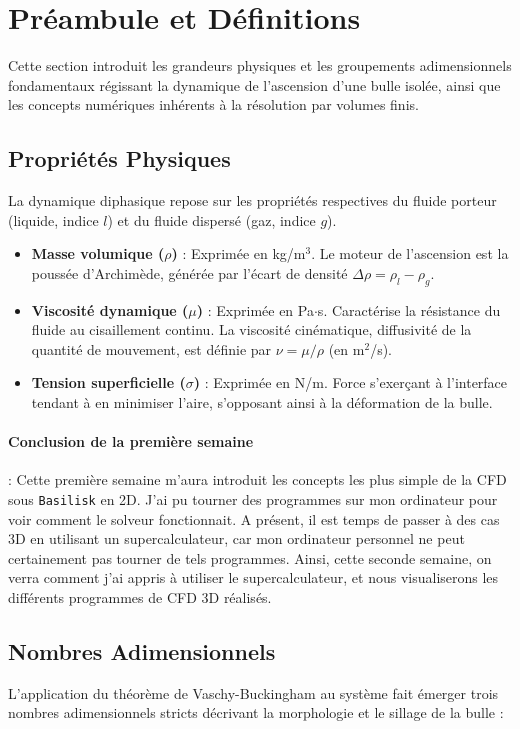 \section{Préambule et Définitions}

Cette section introduit les grandeurs physiques et les groupements adimensionnels fondamentaux régissant la dynamique de l'ascension d'une bulle isolée, ainsi que les concepts numériques inhérents à la résolution par volumes finis.

\subsection{Propriétés Physiques}
La dynamique diphasique repose sur les propriétés respectives du fluide porteur (liquide, indice $l$) et du fluide dispersé (gaz, indice $g$).
\begin{itemize}
    \item \textbf{Masse volumique ($\rho$)} : Exprimée en kg/m$^3$. Le moteur de l'ascension est la poussée d'Archimède, générée par l'écart de densité $\Delta\rho = \rho_l - \rho_g$.
    \item \textbf{Viscosité dynamique ($\mu$)} : Exprimée en Pa$\cdot$s. Caractérise la résistance du fluide au cisaillement continu. La viscosité cinématique, diffusivité de la quantité de mouvement, est définie par $\nu = \mu / \rho$ (en m$^2$/s).
    \item \textbf{Tension superficielle ($\sigma$)} : Exprimée en N/m. Force s'exerçant à l'interface tendant à en minimiser l'aire, s'opposant ainsi à la déformation de la bulle.
\end{itemize}
\paragraph{Conclusion de la première semaine}: Cette première semaine m'aura introduit les concepts les plus simple de la CFD sous \texttt{Basilisk} en 2D. J'ai pu tourner des programmes sur mon ordinateur pour voir comment le solveur fonctionnait. A présent, il est temps de passer à des cas 3D en utilisant un supercalculateur, car mon ordinateur personnel ne peut certainement pas tourner de tels programmes. Ainsi, cette seconde semaine, on verra comment j'ai appris à utiliser le supercalculateur, et nous visualiserons les différents programmes de CFD 3D réalisés. 

\subsection{Nombres Adimensionnels}
L'application du théorème de Vaschy-Buckingham au système fait émerger trois nombres adimensionnels stricts décrivant la morphologie et le sillage de la bulle :

